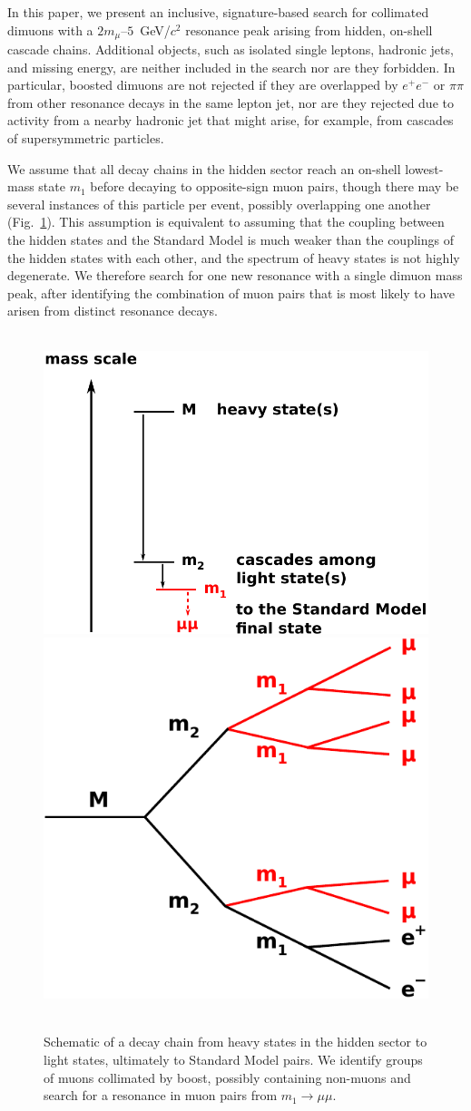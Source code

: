 \documentclass[12pt]{cms-tdr}
\begin{document}

In this paper, we present an inclusive, signature-based search for
collimated dimuons with a $2m_\mu$--$5$~GeV/$c^2$
resonance peak arising from hidden, on-shell cascade chains.
Additional objects, such as isolated single leptons, hadronic jets,
and missing energy, are neither included in the search nor are they
forbidden.  In particular, boosted dimuons are not rejected if they
are overlapped by $e^+e^-$ or $\pi\pi$ from other resonance decays in
the same lepton jet, nor are they rejected due to activity from a
nearby hadronic jet that might arise, for example, from cascades of
supersymmetric particles.

We assume that all decay chains in the hidden sector reach an on-shell
lowest-mass state $m_1$ before decaying to opposite-sign muon pairs,
though there may be several instances of this particle per event,
possibly overlapping one another (Fig.~\ref{fig:basic_picture}).  This
assumption is equivalent to assuming that the coupling between the
hidden states and the Standard Model is much weaker than the couplings
of the hidden states with each other, and the spectrum of heavy states
is not highly degenerate.  We therefore search for one new resonance
with a single dimuon mass peak, after identifying the combination of
muon pairs that is most likely to have arisen from distinct resonance
decays.

\begin{figure}
\mbox{ } \hfill \includegraphics[width=0.45\linewidth]{PLOTS/basic_picture4.pdf} \hfill
\includegraphics[width=0.35\linewidth]{PLOTS/basic_picture5.pdf} \hfill \mbox{ }

\caption{Schematic of a decay chain from heavy states in the hidden
  sector to light states, ultimately to Standard Model pairs.  We
  identify groups of muons collimated by boost, possibly containing
  non-muons and search for a resonance in muon pairs from $m_1 \to
  \mu\mu$. \label{fig:basic_picture}}
\end{figure}
\end{document}
